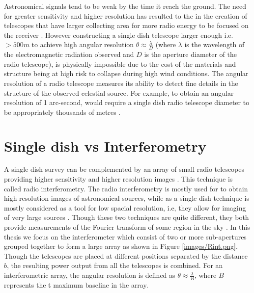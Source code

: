 Astronomical signals tend to be weak by the time it reach the ground. The need for greater sensitivity and higher resolution has resulted to the in the creation of telescopes that have larger collecting area for more radio energy to be focused on the receiver \citep{verschuur2015invisible}. However constructing a single dish telescope larger enough i.e. $>500m$ to achieve high angular resolution $\theta \approx\frac{\lambda}{D}$ (where $\lambda$ is the wavelength of the electromagnetic radiation observed and $D$ is the aperture diameter of the radio telescope), is physically impossible due to the cost of the materials and structure being at high risk to collapse during high wind conditions. The angular resolution of a radio telescope measures its ability to detect fine details in the structure of the observed celestial source. For example, to obtain an angular resolution of 1 arc-second, would require a single dish radio telescope diameter to be appropriately thousands of metres \citep{verschuur2015invisible}. 

\section{Single dish vs Interferometry}
\label{RvI}


A single dish survey can be complemented by an array of small radio telescopes providing higher sensitivity and higher resolution images  \citep{wright2004single}. This technique is called radio interferometry. The radio interferometry is mostly used for to obtain high resolution images of astronomical sources, while as a single dish technique is mostly considered as a tool for low spacial resolution, i.e, they allow for imaging of very large sources \citep{stanimirovic2002short}. Though these two techniques are quite different, they both provide measurements of the Fourier transform of  some region in the sky \citep{cornwell1988radio}. In this thesis we focus on the interferometer which consist of two or more sub-apertures grouped together to form a large array \citep{verschuur2015invisible} as shown in Figure \ref{images/Rint.png}. Though the telescopes are placed at different positions separated by the distance $b$, the resulting power output from all the telescopes is combined. For an interferometric array, the angular resolution is defined as  $\theta \approx\frac{\lambda}{B}$, where $B$ represents the t maximum baseline in the array. 

